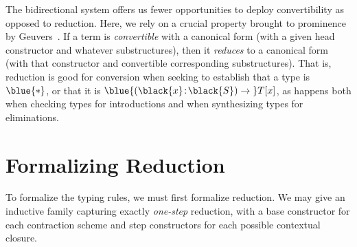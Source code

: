 \documentclass[natbib]{article}
\newcommand{\type}{\blue{\ast}}
\newcommand{\hb}{\!:\!}
\newcommand{\PI}[2]{\blue{(\black{#1}\hb \black{#2})\to\;}}
\begin{document}
The bidirectional system offers us fewer opportunities to deploy
convertibility as opposed to reduction. Here, we rely on a crucial
property brought to prominence by Geuvers~\cite{geuvers:dunnoyet}. If
a term is \emph{convertible} with a canonical form (with a given head
constructor and whatever substructures), then it \emph{reduces} to a
canonical form (with that constructor and convertible corresponding
substructures). That is, reduction is good for conversion when seeking
to establish that a type is $\type$, or that it is $\PI xS T[x]$, as
happens both when checking types for introductions and when
synthesizing types for eliminations.


\section{Formalizing Reduction}

To formalize the typing rules, we must first formalize reduction. We may give
an inductive family capturing exactly \emph{one-step} reduction, with a base
constructor for each contraction scheme and step constructors for each possible
contextual closure.
\end{document}
